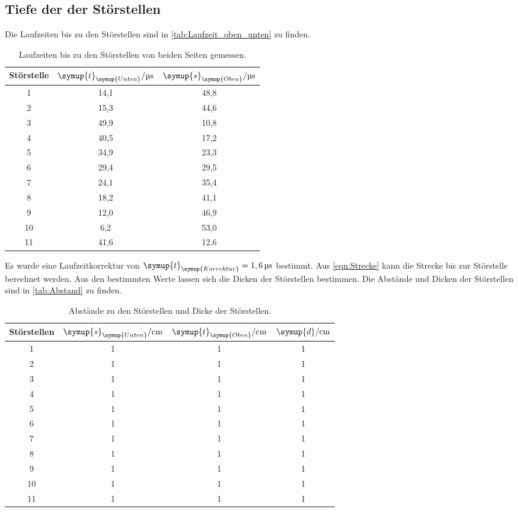 \subsection{Tiefe der der Störstellen}
\label{sec:Tiefe}
Die Laufzeiten bis zu den Störstellen sind in \autoref{tab:Laufzeit_oben_unten} zu finden.
\begin{table}
  \centering
  \begin{tabular}{c c c }
    \toprule
    Störstelle & $\symup{t}_{\symup{Unten}}/\unit{\micro\second}$ & $\symup{s}_{\symup{Oben}}/\unit{\micro\second}$\\
    \midrule
     1 & 14,1 & 48,8 \\
     2 & 15,3 & 44,6 \\
     3 & 49,9 & 10,8 \\
     4 & 40,5 & 17,2 \\
     5 & 34,9 & 23,3 \\
     6 & 29,4 & 29,5 \\
     7 & 24,1 & 35,4 \\
     8 & 18,2 & 41,1 \\
     9 & 12,0 & 46,9 \\
    10 &  6,2 & 53,0 \\
    11 & 41,6 & 12,6 \\
    \bottomrule
  \end{tabular}
  \caption{Laufzeiten bis zu den Störstellen von beiden Seiten gemessen.}
  \label{tab:Laufzeit_oben_unten}
\end{table}
Es wurde eine Laufzeitkorrektur von $\symup{t}_{\symup{Korrektur}} = 1,6\,\unit{\micro\second}$ bestimmt.
Aus \autoref{eqn:Strecke} kann die Strecke bis zur Störstelle berechnet werden. Aus den bestimmten Werte lassen sich
die Dicken der Störstellen bestimmen. Die Abstände und Dicken der Störstellen sind in \autoref{tab:Abstand} zu finden.
\begin{table}
  \centering
  \begin{tabular}{c c c c}
    \toprule
    Störstellen & $\symup{s}_{\symup{Unten}}/\unit{\centi\meter}$ & $\symup{t}_{\symup{Oben}}/\unit{\centi\meter}$ & $\symup{d}/\unit{\centi\meter}$ \\
    \midrule
     1 & 1 & 1 & 1 \\
     2 & 1 & 1 & 1 \\
     3 & 1 & 1 & 1 \\
     4 & 1 & 1 & 1 \\
     5 & 1 & 1 & 1 \\
     6 & 1 & 1 & 1 \\
     7 & 1 & 1 & 1 \\
     8 & 1 & 1 & 1 \\
     9 & 1 & 1 & 1 \\
    10 & 1 & 1 & 1 \\
    11 & 1 & 1 & 1 \\
    \bottomrule
  \end{tabular}
  \caption{Abstände zu den Störstellen und Dicke der Störstellen.}
  \label{tab:Abstand}
\end{table}